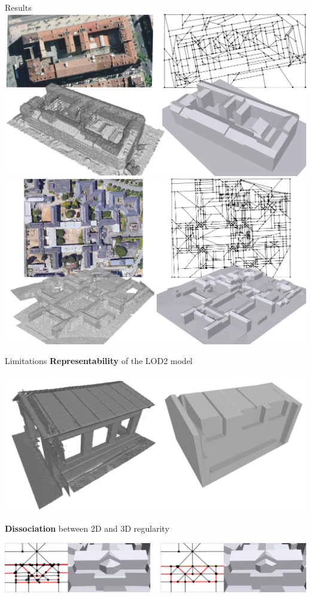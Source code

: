 \begin{frame}[c]{Results}
	\includegraphics[width=0.5\linewidth]{bb_v2}%
	\includegraphics[width=0.5\linewidth]{hoteldieu_v3}
\end{frame}

\begin{frame}{Limitations}
	\small
	\textbf{Representability} of the LOD2 model
	\begin{center}
		\includegraphics[width=0.6\linewidth]{failure_case}
	\end{center}

	\textbf{Dissociation} between 2D and 3D regularity
	\begin{center}
		\includegraphics[width=0.8\linewidth]{closeup_v2}
	\end{center}
\end{frame}
